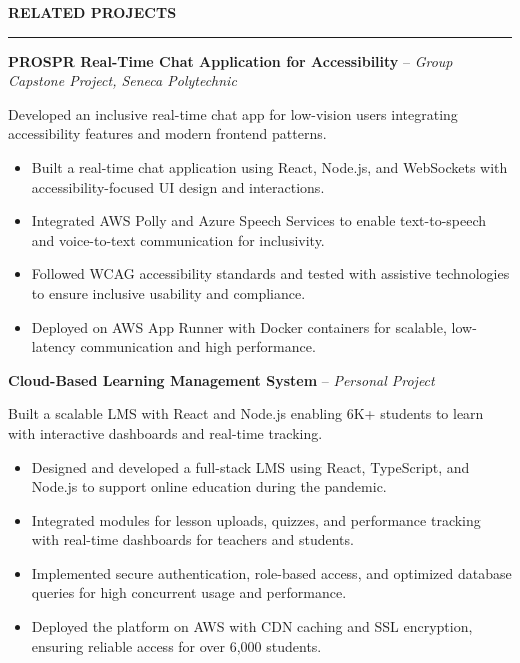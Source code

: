 \documentclass[10pt,letterpaper]{article}
\begin{document}
\vspace{6pt}

\textbf{RELATED PROJECTS}\\[-8pt]
\noindent\rule{\textwidth}{1pt}

\vspace{-2pt}

\textbf{PROSPR  Real-Time Chat Application for Accessibility} -- \emph{Group Capstone Project, Seneca Polytechnic}

\vspace{-1pt}

Developed an inclusive real-time chat app for low-vision users integrating accessibility features and modern frontend patterns.
\vspace{-1pt}
\begin{itemize}
\item Built a real-time chat application using React, Node.js, and WebSockets with accessibility-focused UI design and interactions.
\item Integrated AWS Polly and Azure Speech Services to enable text-to-speech and voice-to-text communication for inclusivity.
\item Followed WCAG accessibility standards and tested with assistive technologies to ensure inclusive usability and compliance.
\item Deployed on AWS App Runner with Docker containers for scalable, low-latency communication and high performance.
\end{itemize}

\textbf{Cloud-Based Learning Management System} -- \emph{Personal Project}

\vspace{-1pt}

Built a scalable LMS with React and Node.js enabling 6K+ students to learn with interactive dashboards and real-time tracking.
\vspace{-1pt}
\begin{itemize}
\item Designed and developed a full-stack LMS using React, TypeScript, and Node.js to support online education during the pandemic.
\item Integrated modules for lesson uploads, quizzes, and performance tracking with real-time dashboards for teachers and students.
\item Implemented secure authentication, role-based access, and optimized database queries for high concurrent usage and performance.
\item Deployed the platform on AWS with CDN caching and SSL encryption, ensuring reliable access for over 6,000 students.
\end{itemize}
\end{document}
